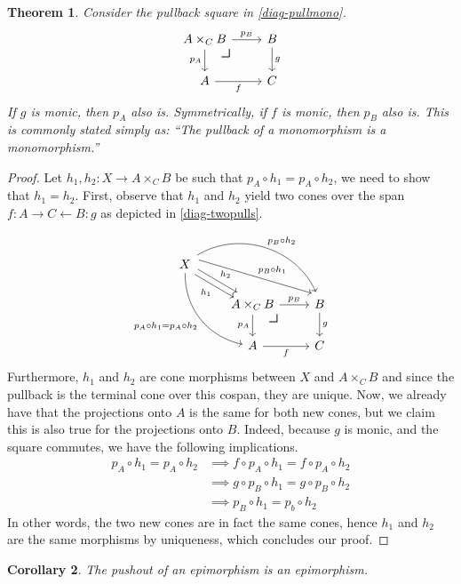 \documentclass{article}
\newtheorem{thm}{Theorem}
\newtheorem{cor}[thm]{Corollary}
\theoremstyle{definition}
\theoremstyle{remark}
\newcommand{\pullback}{\mbox{\LARGE$\lrcorner$}}
\begin{document}
\begin{thm}
    Consider the pullback square in \eqref{diag-pullmono}.
    \begin{equation}\label{diag-pullmono}
        \begin{tikzcd}
            A \times_C B \arrow[r, "p_B"] \arrow[d, "p_A"'] \arrow[dr, phantom, "\pullback", very near start] & B \arrow[d, "g"] \\
            A \arrow[r, "f"'] & C 
        \end{tikzcd}
    \end{equation}
    If $g$ is monic, then $p_A$ also is. Symmetrically, if $f$ is monic, then $p_B$ also is. This is commonly stated simply as: ``The pullback of a monomorphism is a monomorphism.''
\end{thm}
\begin{proof}
    Let $h_1, h_2: X \rightarrow A \times_C B$ be such that $p_A \circ h_1 = p_A \circ h_2$, we need to show that $h_1 = h_2$. First, observe that $h_1$ and $h_2$ yield two cones over the span $f:A \rightarrow C \leftarrow B: g$ as depicted in \eqref{diag-twopulls}.
    \begin{equation}\label{diag-twopulls}
        \begin{tikzcd}
            X \arrow[rd, "h_1"', shift right] \arrow[rd, "h_2", shift left] \arrow[rrd, "p_B \circ h_1", shift left=3] \arrow[rrd, "p_B \circ h_2", bend left=49, shift left] \arrow[rdd, "p_A \circ h_1 = p_A \circ h_2"', bend right=39]  & & \\
            & A \times_C B \arrow[r, "p_B"] \arrow[d, "p_A"'] \arrow[rd, "\pullback", phantom, very near start] & B \arrow[d, "g"] \\ & A \arrow[r, "f"'] & C
        \end{tikzcd}
    \end{equation}
    Furthermore, $h_1$ and $h_2$ are cone morphisms between $X$ and $A \times_C B$ and since the pullback is the terminal cone over this cospan, they are unique. Now, we already have that the projections onto $A$ is the same for both new cones, but we claim this is also true for the projections onto $B$. Indeed, because $g$ is monic, and the square commutes, we have the following implications.
    \begin{align*}
        p_A \circ h_1 = p_A \circ h_2 &\implies f \circ p_A \circ h_1 = f \circ p_A \circ h_2\\
        &\implies g \circ p_B \circ h_1 = g \circ p_B \circ h_2\\
        &\implies p_B \circ h_1 = p_b \circ h_2
    \end{align*}
    In other words, the two new cones are in fact the same cones, hence $h_1$ and $h_2$ are the same morphisms by uniqueness, which concludes our proof.
\end{proof}
\begin{cor}
    The pushout of an epimorphism is an epimorphism.
\end{cor}
\end{document}
